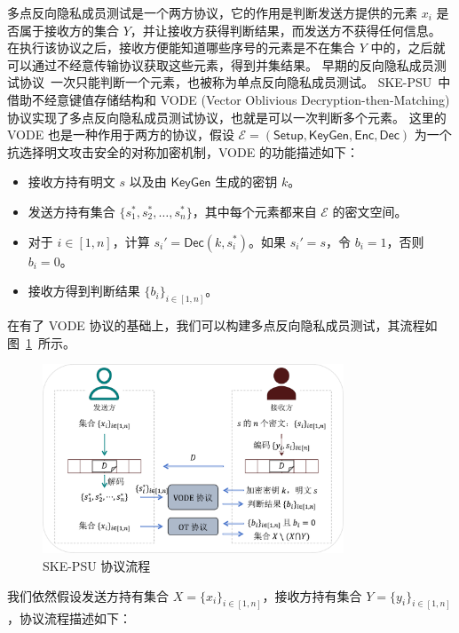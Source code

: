 多点反向隐私成员测试是一个两方协议，它的作用是判断发送方提供的元素 $x_i$ 是否属于接收方的集合 $Y$，并让接收方获得判断结果，而发送方不获得任何信息。
在执行该协议之后，接收方便能知道哪些序号的元素是不在集合 $Y$ 中的，之后就可以通过不经意传输协议获取这些元素，得到并集结果。
早期的反向隐私成员测试协议~\cite{kolesnikov2019scalable}一次只能判断一个元素，也被称为单点反向隐私成员测试。
SKE-PSU~\cite{zhang2023linear}中借助不经意键值存储结构和 VODE (Vector Oblivious Decryption-then-Matching) 协议实现了多点反向隐私成员测试协议，也就是可以一次判断多个元素。
这里的 VODE 也是一种作用于两方的协议，假设 $\mathcal{E} = (\mathsf{Setup}, \mathsf{KeyGen}, \mathsf{Enc}, \mathsf{Dec})$ 为一个抗选择明文攻击安全的对称加密机制，VODE 的功能描述如下：
\begin{itemize}
  \item 接收方持有明文 $s$ 以及由 $\mathsf{KeyGen}$ 生成的密钥 $k$。
  \item 发送方持有集合 $\{s_1^*, s_2^*, \dots, s_n^*\}$，其中每个元素都来自 $\mathcal{E}$ 的密文空间。
  \item 对于 $i\in [1,n]$，计算 $s_i' = \mathsf{Dec}(k, s_i^*)$。如果 $s_i' = s$，令 $b_i = 1$，否则 $b_i = 0$。
  \item 接收方得到判断结果 $\{b_i\}_{i\in [1,n]}$。
\end{itemize}
在有了 VODE 协议的基础上，我们可以构建多点反向隐私成员测试，其流程如图~\ref{fig:psu_okvs}~所示。
\begin{figure}[ht]
  \centering
  \includegraphics[width=0.8\textwidth]{figures/psu_okvs.pdf}
  \caption{SKE-PSU 协议流程}
  \label{fig:psu_okvs}
\end{figure}
我们依然假设发送方持有集合 $X = \{x_i\}_{i\in [1,n]}$，接收方持有集合 $Y = \{y_i\}_{i\in [1,n]}$，协议流程描述如下：
